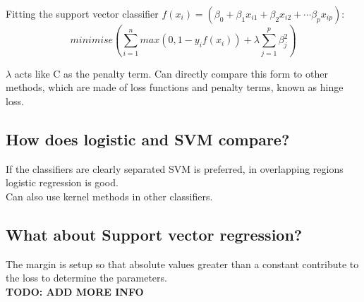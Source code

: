 \documentclass[11pt]{scrartcl} %
\begin{document}
Fitting the support vector classifier \(f(x_i) = (\beta_0+\beta_1x_{i1}+\beta_2x_{i2}+\cdots \beta_px_{ip})\):
\begin{equation}
	minimise({\sum^n_{i=1}{max(0,1-y_if(x_i))+\lambda\sum^p_{j=1}{\beta^2_j}}})
\end{equation}

\(\lambda\) acts like C as the penalty term. Can directly compare this form to other methods, which are
made of loss functions and penalty terms, known as hinge loss.

\subsection{How does logistic and SVM compare?}

If the classifiers are clearly separated SVM is preferred, in overlapping regions logistic regression is good.\\

Can also use kernel methods in other classifiers.

\subsection{What about Support vector regression?}

The margin is setup so that absolute values greater than a constant contribute to the loss to determine
the parameters.\\

\textbf{TODO: ADD MORE INFO}

\medskip

\printbibliography



\end{document}
